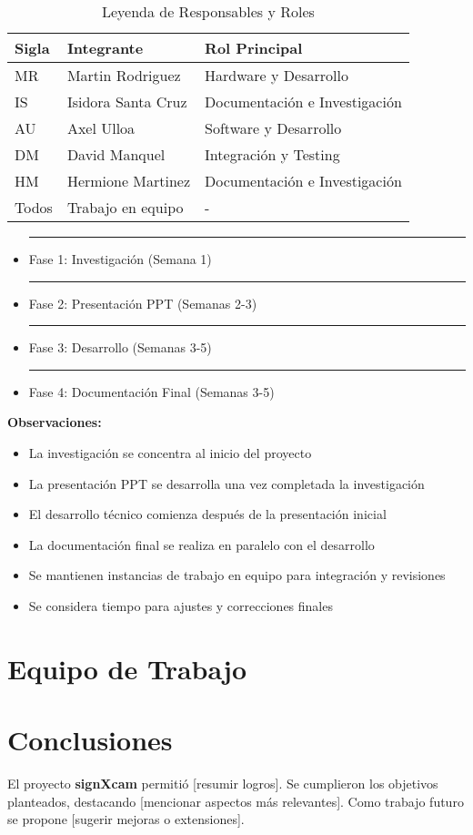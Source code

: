 \documentclass[a4paper,12pt]{article}
\begin{document}
\begin{table}[h]
\centering
\begin{tabular}{|l|l|l|}
\hline
\textbf{Sigla} & \textbf{Integrante} & \textbf{Rol Principal} \\
\hline
MR & Martin Rodriguez & Hardware y Desarrollo \\
IS & Isidora Santa Cruz & Documentación e Investigación \\
AU & Axel Ulloa & Software y Desarrollo \\
DM & David Manquel & Integración y Testing \\
HM & Hermione Martinez & Documentación e Investigación \\
Todos & Trabajo en equipo & - \\
\hline
\end{tabular}
\caption{Leyenda de Responsables y Roles}
\end{table}

\begin{itemize}
\item \textcolor{fase1}{\rule{0.5cm}{0.5cm}} Fase 1: Investigación (Semana 1)
\item \textcolor{fase2}{\rule{0.5cm}{0.5cm}} Fase 2: Presentación PPT (Semanas 2-3)
\item \textcolor{fase3}{\rule{0.5cm}{0.5cm}} Fase 3: Desarrollo (Semanas 3-5)
\item \textcolor{fase4}{\rule{0.5cm}{0.5cm}} Fase 4: Documentación Final (Semanas 3-5)
\end{itemize}

\textbf{Observaciones:}
\begin{itemize}
\item La investigación se concentra al inicio del proyecto
\item La presentación PPT se desarrolla una vez completada la investigación
\item El desarrollo técnico comienza después de la presentación inicial
\item La documentación final se realiza en paralelo con el desarrollo
\item Se mantienen instancias de trabajo en equipo para integración y revisiones
\item Se considera tiempo para ajustes y correcciones finales
\end{itemize}
\section{Equipo de Trabajo}
\section{Conclusiones}
El proyecto \textbf{signXcam} permitió [resumir logros]. Se cumplieron los objetivos planteados, destacando [mencionar aspectos más relevantes]. Como trabajo futuro se propone [sugerir mejoras o extensiones].
\end{document}
